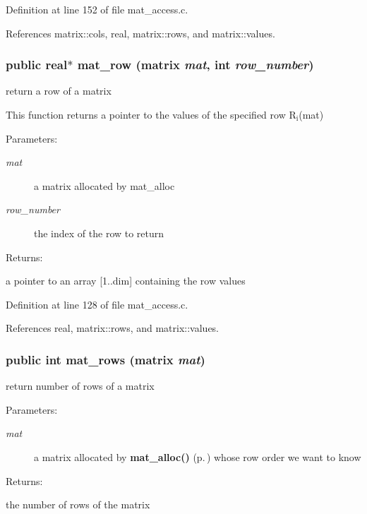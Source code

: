 Definition at line 152 of file mat\_\-access.c.

References matrix::cols, real, matrix::rows, and matrix::values.
\subsubsection{\setlength{\rightskip}{0pt plus 5cm}public {\bf real}$\ast$ mat\_\-row ({\bf matrix} {\em mat}, int {\em row\_\-number})}\label{group__matrix__access_a3}


return a row of a matrix

This function returns a pointer to the values of the specified row R$_{\mbox{i}}$(mat)\begin{Desc}
\item[Parameters: ]\par
\begin{description}
\item[{\em 
mat}]a matrix allocated by mat\_\-alloc \item[{\em 
row\_\-number}]the index of the row to return \end{description}
\end{Desc}
\begin{Desc}
\item[Returns: ]\par
a pointer to an array [1..dim] containing the row values \end{Desc}


Definition at line 128 of file mat\_\-access.c.

References real, matrix::rows, and matrix::values.
\subsubsection{\setlength{\rightskip}{0pt plus 5cm}public int mat\_\-rows ({\bf matrix} {\em mat})}\label{group__matrix__access_a0}


return number of rows of a matrix

\begin{Desc}
\item[Parameters: ]\par
\begin{description}
\item[{\em 
mat}]a matrix allocated by {\bf mat\_\-alloc()} {\rm (p.\,\pageref{group__matrix__housekeeping_a0})} whose row order we want to know \end{description}
\end{Desc}
\begin{Desc}
\item[Returns: ]\par
the number of rows of the matrix \end{Desc}


